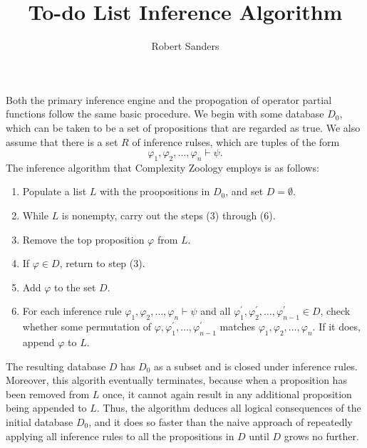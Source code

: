 \documentclass[12pt]{amsart}
\title{To-do List Inference Algorithm}
\date{}
\author{Robert Sanders}
\theoremstyle{definition}
\theoremstyle{remark}
\begin{document}
\maketitle

Both the primary inference engine and the propogation of operator partial
functions follow the same basic procedure. We begin with some database $D_0$,
which can be taken to be a set of propositions that are regarded as true. We
also assume that there is a set $R$ of inference rulses, which are tuples of the
form
\[
\varphi_1,\varphi_2,\ldots,\varphi_n\vdash\psi.
\]
The inference algorithm that Complexity Zoology employs is as follows:
\begin{enumerate}
\item Populate a list $L$ with the proopositions in $D_0$, and set
  $D=\emptyset$.
\item While $L$ is nonempty, carry out the steps (3) through (6).
\item Remove the top proposition $\varphi$ from $L$.
\item If $\varphi\in D$, return to step (3).
\item Add $\varphi$ to the set $D$.
\item For each inference rule $\varphi_1,\varphi_2,\ldots,\varphi_n\vdash\psi$
  and all $\varphi_1^\prime,\varphi_2^\prime,\ldots,\varphi_{n-1}^\prime\in D$,
  check whether some permutation of
  $\varphi,\varphi_1^\prime,\ldots,\varphi_{n-1}^\prime$ matches
  $\varphi_1,\varphi_2,\ldots,\varphi_n$. If it does, append $\varphi$ to $L$.
\end{enumerate}
The resulting database $D$ has $D_0$ as a subset and is closed under inference
rules. Moreover, this algorith eventually terminates, because when a proposition
has been removed from $L$ once, it cannot again result in any additional
proposition being appended to $L$. Thus, the algorithm deduces all logical
consequences of the initial database $D_0$, and it does so faster than the naive
approach of repeatedly applying all inference rules to all the propositions in
$D$ until $D$ grows no further.
\end{document}
